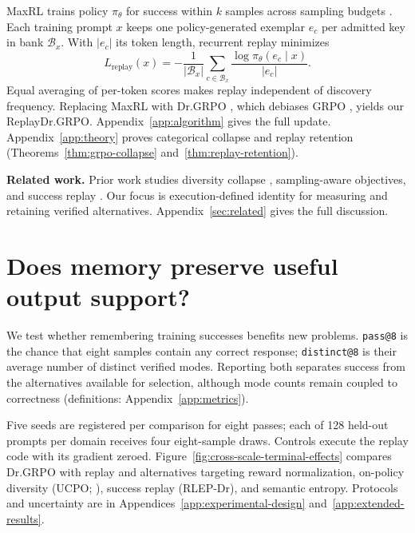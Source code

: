 MaxRL trains policy $\pi_\theta$ for success within $k$ samples across sampling
budgets \citep{tajwar2026maxrl}. Each training prompt $x$ keeps one
policy-generated exemplar $e_c$ per admitted key in bank $\mathcal B_x$.
With $|e_c|$ its token length, recurrent replay minimizes
\begin{equation}
L_{\mathrm{replay}}(x)=-\frac{1}{|\mathcal B_x|}
\sum_{c\in\mathcal B_x}\frac{\log\pi_\theta(e_c\mid x)}{|e_c|}.
\label{eq:lm-verified-replay}
\end{equation}
Equal averaging of per-token scores makes replay independent of discovery frequency. Replacing MaxRL with Dr.GRPO \citep{liu2025understanding},
which debiases GRPO \citep{shao2024deepseekmath}, yields our ReplayDr.GRPO.
Appendix~\ref{app:algorithm} gives
the full update. Appendix~\ref{app:theory} proves categorical collapse and
replay retention (Theorems~\ref{thm:grpo-collapse} and~\ref{thm:replay-retention}).

\noindent\textbf{Related work.} Prior work studies diversity collapse
\citep{cui2025entropy,dang2025diversity}, sampling-aware objectives, and success
replay \citep{zhang2025rlep}. Our focus is execution-defined identity for
measuring and retaining verified alternatives. Appendix~\ref{sec:related}
gives the full discussion.

\section{Does memory preserve useful output support?}
\label{sec:experiments}\label{sec:results}
We test whether remembering training successes benefits new problems.
\texttt{pass@8} is the chance that eight samples contain any correct response;
\texttt{distinct@8} is their average number of distinct verified modes. Reporting
both separates success from the alternatives available for selection, although
mode counts remain coupled to correctness (definitions: Appendix~\ref{app:metrics}).

Five seeds are registered per comparison for eight passes; each of 128 held-out prompts per
domain receives four eight-sample draws. Controls execute the replay code with its gradient zeroed. Figure~\ref{fig:cross-scale-terminal-effects} compares
Dr.GRPO with replay and alternatives targeting reward normalization, on-policy
diversity (UCPO; \citealp{lochab2026ucpo}), success replay (RLEP-Dr),
and semantic entropy. Protocols and uncertainty are in
Appendices~\ref{app:experimental-design} and~\ref{app:extended-results}.

